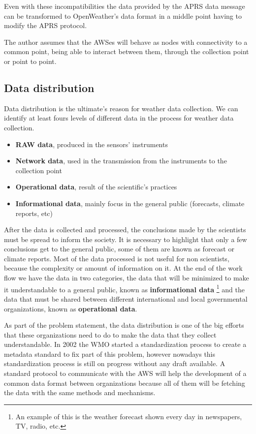 {Even with these incompatibilities the data provided by the \gls{APRS} data message can be transformed to OpenWeather's data format in a middle point having to modify the \gls{APRS} protocol. 

The author assumes that the \gls{AWS}es will behave as nodes with connectivity to a common point, being able to interact between them, through the collection point or point to point.

\subsection{Data distribution}\label{3.2.2}

Data distribution is the ultimate's reason for weather data collection. We can identify at least fours levels of different data in the process for weather data collection.

\begin{itemize}
\item \textbf{RAW data}, produced in the sensors'  instruments
\item \textbf{Network data}, used in the transmission from the instruments to the collection point
\item \textbf{Operational data}, result of the scientific's practices
\item \textbf{Informational data}, mainly focus in the general public (forecasts, climate reports, etc)
\end{itemize}

After the data is collected and processed, the conclusions made by the scientists must be spread to inform the society. It is necessary to highlight that only a few conclusions get to the general public, some of them are known as forecast or climate reports. Most of the data processed  is not useful for non scientists, because the complexity or amount of information on it. At the end of the work flow we have the data in two categories, the data that will be minimized to make it understandable to a general public, known as \textbf{informational data} \footnote{An example of this is the weather forecast shown every day in newspapers, TV, radio, etc.} and the data that must be shared between different international and local governmental organizations, known as \textbf{operational data}.

As part of the problem statement, the data distribution is one of the big efforts that these organizations need to do to make the data that they collect understandable. In 2002 the \gls{WMO} started a standardization process to create a metadata standard to fix part of this problem, however nowadays this standardization process is still on progress without any draft available\cite{WMOMETADA}. A standard protocol to communicate with the \gls{AWS} will help the development of a common data format between organizations because all of them will be fetching the data with the same methods and mechanisms.

}
